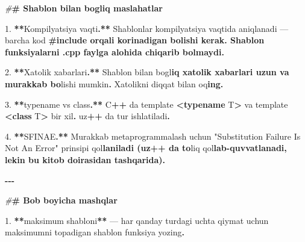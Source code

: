 \documentclass[a4paper,11pt,twoside,openright]{book}
\newenvironment{Shaded}{\begin{snugshade}}{\end{snugshade}}
\newcommand{\CharTok}[1]{\textcolor[rgb]{0.31,0.60,0.02}{#1}}
\newcommand{\ErrorTok}[1]{\textcolor[rgb]{0.64,0.00,0.00}{\textbf{#1}}}
\newcommand{\FloatTok}[1]{\textcolor[rgb]{0.00,0.00,0.81}{#1}}
\newcommand{\KeywordTok}[1]{\textcolor[rgb]{0.13,0.29,0.53}{\textbf{#1}}}
\newcommand{\NormalTok}[1]{#1}
\newcommand{\OperatorTok}[1]{\textcolor[rgb]{0.81,0.36,0.00}{\textbf{#1}}}
\newcommand{\PreprocessorTok}[1]{\textcolor[rgb]{0.56,0.35,0.01}{\textit{#1}}}
\newcommand{\StringTok}[1]{\textcolor[rgb]{0.31,0.60,0.02}{#1}}
\begin{document}
\begin{Shaded}
\begin{Highlighting}[]
\PreprocessorTok{\#}\ErrorTok{\# Shablon bilan bog\textquotesingle{}liq maslahatlar}

\FloatTok{1.} \OperatorTok{**}\NormalTok{Kompilyatsiya vaqti}\OperatorTok{.**}\NormalTok{ Shablonlar kompilyatsiya vaqtida aniqlanadi — barcha kod }\ErrorTok{\textasciigrave{}\#include\textasciigrave{} orqali ko\textquotesingle{}rinadigan bo\textquotesingle{}lishi kerak. Shablon funksiyalarni \textasciigrave{}.cpp\textasciigrave{} faylga alohida chiqarib bo\textquotesingle{}lmaydi.}

\FloatTok{2.} \OperatorTok{**}\NormalTok{Xatolik xabarlari}\OperatorTok{.**}\NormalTok{ Shablon bilan bog}\CharTok{\textquotesingle{}l}\ErrorTok{iq xatolik xabarlari uzun va murakkab bo}\CharTok{\textquotesingle{}}\NormalTok{lishi mumkin}\OperatorTok{.}\NormalTok{ Xatolikni diqqat bilan o}\CharTok{\textquotesingle{}q}\ErrorTok{ing.}

\FloatTok{3.} \OperatorTok{**}\ErrorTok{\textasciigrave{}}\NormalTok{typename}\ErrorTok{\textasciigrave{}}\NormalTok{ vs }\ErrorTok{\textasciigrave{}}\NormalTok{class}\ErrorTok{\textasciigrave{}}\OperatorTok{.**}\NormalTok{ C}\OperatorTok{++}\NormalTok{ da }\ErrorTok{\textasciigrave{}}\NormalTok{template }\OperatorTok{\textless{}}\KeywordTok{typename}\NormalTok{ T}\OperatorTok{\textgreater{}}\ErrorTok{\textasciigrave{}}\NormalTok{ va }\ErrorTok{\textasciigrave{}}\NormalTok{template }\OperatorTok{\textless{}}\KeywordTok{class}\NormalTok{ T}\OperatorTok{\textgreater{}}\ErrorTok{\textasciigrave{}}\NormalTok{ bir xil}\OperatorTok{.}\NormalTok{ uz}\OperatorTok{++}\NormalTok{ da }\ErrorTok{\textasciigrave{}}\NormalTok{tur}\ErrorTok{\textasciigrave{}}\NormalTok{ ishlatiladi}\OperatorTok{.}

\FloatTok{4.} \OperatorTok{**}\NormalTok{SFINAE}\OperatorTok{.**}\NormalTok{ Murakkab metaprogrammalash uchun }\StringTok{"Substitution Failure Is Not An Error"}\NormalTok{ prinsipi qo}\CharTok{\textquotesingle{}l}\ErrorTok{laniladi (uz++ da to}\CharTok{\textquotesingle{}}\NormalTok{liq qo}\CharTok{\textquotesingle{}l}\ErrorTok{lab{-}quvvatlanadi, lekin bu kitob doirasidan tashqarida).}

\OperatorTok{{-}{-}{-}}

\PreprocessorTok{\#}\ErrorTok{\# Bob bo\textquotesingle{}yicha mashqlar}

\FloatTok{1.} \OperatorTok{**}\ErrorTok{\textasciigrave{}}\NormalTok{maksimum}\ErrorTok{\textasciigrave{}}\NormalTok{ shabloni}\OperatorTok{**}\NormalTok{ — har qanday turdagi uchta qiymat uchun maksimumni topadigan shablon funksiya yozing}\OperatorTok{.}


\end{Highlighting}
\end{Shaded}
\end{document}

